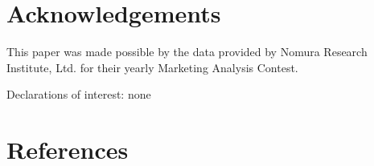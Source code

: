 \documentclass[review]{elsarticle}
\begin{document}
\section{Acknowledgements}

This paper was made possible by the data provided by Nomura Research Institute, Ltd. for their yearly Marketing Analysis Contest.

Declarations of interest: none

\section*{References}







\end{document}

